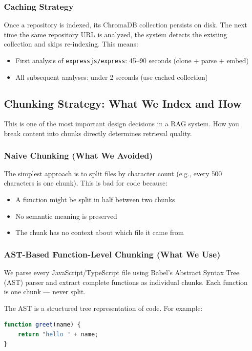 \documentclass[a4paper,11pt]{article}
\begin{document}
\subsubsection{Caching Strategy}
Once a repository is indexed, its ChromaDB collection persists on disk. The next time the same repository URL is analyzed, the system detects the existing collection and skips re-indexing. This means:
\begin{itemize}
    \item First analysis of \texttt{expressjs/express}: 45--90 seconds (clone + parse + embed)
    \item All subsequent analyses: under 2 seconds (use cached collection)
\end{itemize}

\subsection{Chunking Strategy: What We Index and How}

This is one of the most important design decisions in a RAG system. How you break content into chunks directly determines retrieval quality.

\subsubsection{Naive Chunking (What We Avoided)}
The simplest approach is to split files by character count (e.g., every 500 characters is one chunk). This is bad for code because:
\begin{itemize}
    \item A function might be split in half between two chunks
    \item No semantic meaning is preserved
    \item The chunk has no context about which file it came from
\end{itemize}

\subsubsection{AST-Based Function-Level Chunking (What We Use)}
We parse every JavaScript/TypeScript file using Babel's Abstract Syntax Tree (AST) parser and extract complete functions as individual chunks. Each function is one chunk --- never split.

The AST is a structured tree representation of code. For example:
\begin{lstlisting}[language=JavaScript]
function greet(name) {
    return "hello " + name;
}
\end{lstlisting}
\end{document}

